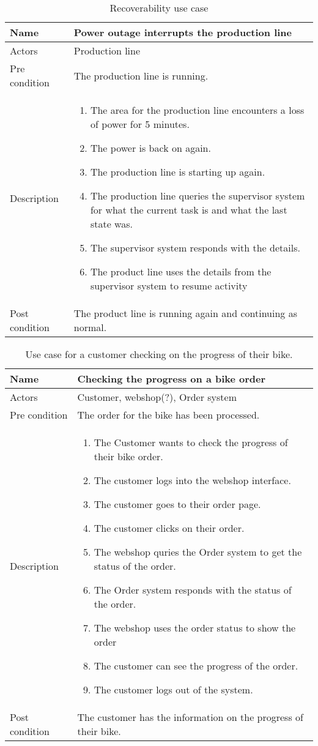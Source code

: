 \begin{table}[h]
\caption{Recoverability use case}
\centering
\begin{tabular}{|l|p{8cm}|} \hline
Name & Power outage interrupts the production line \\ \hline
Actors & Production line \\ \hline
Pre condition & The production line is running.  \\ \hline
Description & \begin{enumerate} 
\item The area for the production line encounters a loss of power for 5 minutes.
\item The power is back on again.
\item The production line is starting up again.
\item The production line queries the supervisor system for what the current task is and what the last state was.
\item The supervisor system responds with the details.
\item The product line uses the details from the supervisor system to resume activity
\end{enumerate} \\ \hline
Post condition & The product line is running again and continuing as normal. \\
\hline
\end{tabular}
\end{table}


\begin{table}[h]
\caption{Use case for a customer checking on the progress of their bike.}
\centering
\begin{tabular}{|l|p{8cm}|} \hline
Name & Checking the progress on a bike order\\ \hline
Actors & Customer, webshop(?), Order system \\ \hline
Pre condition & The order for the bike has been processed.  \\ \hline
Description & \begin{enumerate} 
    \item The Customer wants to check the progress of their bike order.
    \item The customer logs into the webshop interface.
    \item The customer goes to their order page.
    \item The customer clicks on their order.
    \item The webshop quries the Order system to get the status of the order.
    \item The Order system responds with the status of the order. 
    \item The webshop uses the order status to show the order
    \item The customer can see the progress of the order.
    \item The customer logs out of the system.
\end{enumerate} \\ \hline
Post condition & The customer has the information on the progress of their bike. \\
\hline
\end{tabular}
\end{table}
